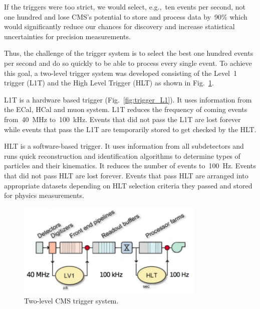 If the triggers were too strict, we would select, e.g.,~ten events per second, not one hundred and lose CMS's potential to store and process data by~90\% which would significantly reduce our chances for discovery and increase statistical uncertainties for precision measurements.

Thus, the challenge of the trigger system is to select the best one hundred events per second and do so quickly to be able to process every single event. To achieve this goal, a two-level trigger system was developed consisting of the Level~1 trigger (L1T) and the High Level Trigger (HLT) as shown in Fig.~\ref{fig:trigger_2level}.

L1T is a hardware based trigger (Fig.~\ref{fig:trigger_L1}). It uses information from the ECal, HCal and muon system. L1T reduces the frequency of coming events from~40~MHz to~100~kHz. Events that did not pass the L1T are lost forever while events that pass the L1T are temporarily stored to get checked by the HLT.

HLT is a software-based trigger. It uses information from all subdetectors and runs quick reconstruction and identification algorithms to determine types of particles and their kinematics. It reduces the number of events to~100~Hz. Events that did not pass HLT are lost forever. Events that pass HLT are arranged into appropriate datasets depending on HLT selection criteria they passed and stored for physics measurements.

\begin{figure}[htb]
  \begin{center}
    \includegraphics[width=0.8\textwidth]{../figs/Exp/trigger_2level.png}
    \caption{Two-level CMS trigger system.}
    \label{fig:trigger_2level}
  \end{center}
\end{figure}


